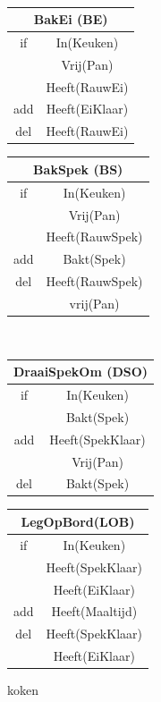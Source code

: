 \documentclass[alternative-exam.tex]{subfiles}
\begin{document}
\begin{itemize}
\begin{figure}[H]
\begin{tabular}{|c|c|}
    \hline
\end{tabular}
\\\vspace{0.25cm}
\begin{tabular}{|c|c|}
    \multicolumn{2}{c}{BakEi (BE)}\\
    \hline
    if & In(Keuken)\\
    & Vrij(Pan)\\
    & Heeft(RauwEi)\\
    \hline
    add & Heeft(EiKlaar)\\
    \hline
    del & Heeft(RauwEi)\\
    \hline
\end{tabular}
\hspace{0.25cm}
\begin{tabular}{|c|c|}
    \multicolumn{2}{c}{BakSpek (BS)}\\
    \hline
    if & In(Keuken)\\
    & Vrij(Pan)\\
    & Heeft(RauwSpek)\\
    \hline
    add & Bakt(Spek)\\
    \hline
    del & Heeft(RauwSpek)\\
    & vrij(Pan)\\
    \hline
\end{tabular}
\\\vspace{0.25cm}
\begin{tabular}{|c|c|}
    \multicolumn{2}{c}{DraaiSpekOm (DSO)}\\
    \hline
    if & In(Keuken)\\
    & Bakt(Spek)\\
    \hline
    add & Heeft(SpekKlaar)\\
    & Vrij(Pan)\\
    \hline
    del & Bakt(Spek)\\
    \hline
\end{tabular}
\hspace{0.25cm}
\begin{tabular}{|c|c|}
    \multicolumn{2}{c}{LegOpBord(LOB)}\\
    \hline
    if & In(Keuken)\\
    & Heeft(SpekKlaar)\\
    & Heeft(EiKlaar)\\
    \hline
    add & Heeft(Maaltijd)\\
    \hline
    del & Heeft(SpekKlaar)\\
    & Heeft(EiKlaar)\\
    \hline
\end{tabular}
\caption{koken}
\label{koken}
\end{figure}
\end{itemize}
\end{document}
